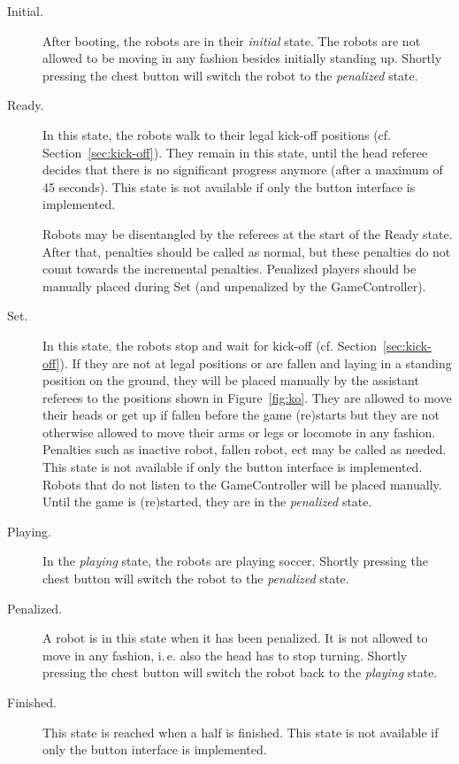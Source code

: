 \documentclass[12pt]{article}
\newcommand{\ie}{\mbox{i.\,e.}\xspace}
\newcommand{\cf}{\mbox{cf.}\xspace}
\newcommand{\KickOffAutoTime}{45 seconds\xspace}
\begin{document}
\begin{description}

\item[Initial.] After booting, the robots are in their \emph{initial} state. The robots are not allowed to be moving in any fashion besides initially standing up. Shortly pressing the chest button will switch the robot to the \emph{penalized} state.

\item[Ready.] In this state, the robots walk to their legal kick-off positions (\cf Section~\ref{sec:kick-off}). They remain in this state, until the head referee decides that there is no significant progress anymore (after a maximum of \KickOffAutoTime). This state is not available if only the button interface is implemented.

Robots may be disentangled by the referees at the start of the Ready state. After that, penalties should be called as normal, but these penalties do not count towards the incremental penalties.  Penalized players should be manually placed during Set (and unpenalized by the GameController).

\item[Set.] In this state, the robots stop and wait for kick-off (\cf Section~\ref{sec:kick-off}). If they are not at legal positions or are fallen and laying in a standing position on the ground, they will be placed manually by the assistant referees to the positions shown in Figure~\ref{fig:ko}. They are allowed to move their heads or get up if fallen before the game (re)starts but they are not otherwise allowed to move their arms or legs or locomote in any fashion. Penalties such as inactive robot, fallen robot, ect may be called as needed. This state is not available if only the button interface is implemented. Robots that do not listen to the GameController will be placed manually. Until the game is (re)started, they are in the \emph{penalized} state.

\item[Playing.] In the \emph{playing} state, the robots are playing soccer. Shortly pressing the chest button will switch the robot to the \emph{penalized} state.

\item[Penalized.] A robot is in this state when it has been penalized. It is not allowed to move in any fashion, \ie also the head has to stop turning. Shortly pressing the chest button will switch the robot back to the \emph{playing} state.

\item[Finished.] This state is reached when a half is finished. This state is not available if only the button interface is implemented.

\end{description}
\end{document}

